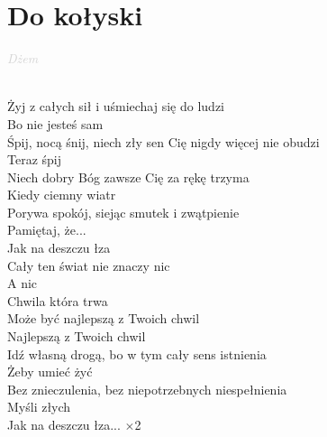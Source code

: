 \documentclass[a5paper, 10pt]{book}
\begin{document}
\section{Do kołyski}\textcolor{lightgray}{\textit{Dżem}}\\~\\
\begin{minipage}[t]{0.7\textwidth}
Żyj z całych sił i uśmiechaj się do ludzi\\
Bo nie jesteś sam\\
Śpij, nocą śnij, niech zły sen Cię nigdy więcej nie obudzi\\
Teraz śpij\\

Niech dobry Bóg zawsze Cię za rękę trzyma\\
Kiedy ciemny wiatr\\
Porywa spokój, siejąc smutek i zwątpienie\\
Pamiętaj, że...\\

\hspace*{5mm}Jak na deszczu łza\\
\hspace*{5mm}Cały ten świat nie znaczy nic\\
\hspace*{5mm}A nic\\
\hspace*{5mm}Chwila która trwa\\
\hspace*{5mm}Może być najlepszą z Twoich chwil\\
\hspace*{5mm}Najlepszą z Twoich chwil\\

Idź własną drogą, bo w tym cały sens istnienia\\
Żeby umieć żyć\\
Bez znieczulenia, bez niepotrzebnych niespełnienia\\
Myśli złych\\

\hspace*{5mm}Jak na deszczu łza... $\times$2\\

\end{minipage}
\end{document}
